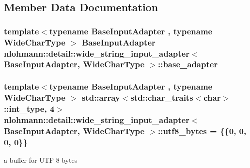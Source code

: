 \subsection{Member Data Documentation}
\subsubsection[{\texorpdfstring{base\+\_\+adapter}{base_adapter}}]{\setlength{\rightskip}{0pt plus 5cm}template$<$typename Base\+Input\+Adapter , typename Wide\+Char\+Type $>$ Base\+Input\+Adapter {\bf nlohmann\+::detail\+::wide\+\_\+string\+\_\+input\+\_\+adapter}$<$ Base\+Input\+Adapter, Wide\+Char\+Type $>$\+::base\+\_\+adapter\hspace{0.3cm}{\ttfamily [private]}}\hypertarget{classnlohmann_1_1detail_1_1wide__string__input__adapter_a6951ed130bc49fbee6e434b62ed187ac}{}\label{classnlohmann_1_1detail_1_1wide__string__input__adapter_a6951ed130bc49fbee6e434b62ed187ac}
\subsubsection[{\texorpdfstring{utf8\+\_\+bytes}{utf8_bytes}}]{\setlength{\rightskip}{0pt plus 5cm}template$<$typename Base\+Input\+Adapter , typename Wide\+Char\+Type $>$ {\bf std\+::array}$<$std\+::char\+\_\+traits$<$char$>$\+::int\+\_\+type, 4$>$ {\bf nlohmann\+::detail\+::wide\+\_\+string\+\_\+input\+\_\+adapter}$<$ Base\+Input\+Adapter, Wide\+Char\+Type $>$\+::utf8\+\_\+bytes = \{\{0, 0, 0, 0\}\}\hspace{0.3cm}{\ttfamily [private]}}\hypertarget{classnlohmann_1_1detail_1_1wide__string__input__adapter_af6bded96214b2fe8edd142d92141550e}{}\label{classnlohmann_1_1detail_1_1wide__string__input__adapter_af6bded96214b2fe8edd142d92141550e}


a buffer for U\+T\+F-\/8 bytes 

